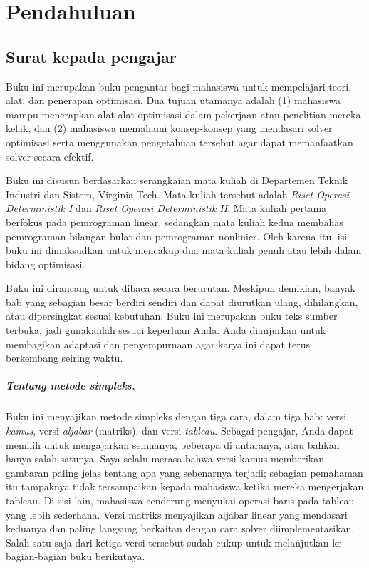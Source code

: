
\chapter*{Pendahuluan}
\section*{Surat kepada pengajar}

Buku ini merupakan buku pengantar bagi mahasiswa untuk mempelajari teori, alat, dan penerapan optimisasi.  Dua tujuan utamanya adalah (1) mahasiswa mampu menerapkan alat-alat optimisasi dalam pekerjaan atau penelitian mereka kelak, dan (2) mahasiswa memahami konsep-konsep yang mendasari solver optimisasi serta menggunakan pengetahuan tersebut agar dapat memanfaatkan solver secara efektif.

Buku ini disusun berdasarkan serangkaian mata kuliah di Departemen Teknik Industri dan Sistem, Virginia Tech.   Mata kuliah tersebut adalah \emph{Riset Operasi Deterministik I} dan \emph{Riset Operasi Deterministik II}.   Mata kuliah pertama berfokus pada pemrograman linear, sedangkan mata kuliah kedua membahas pemrograman bilangan bulat dan pemrograman nonlinier.  Oleh karena itu, isi buku ini dimaksudkan untuk mencakup dua mata kuliah penuh atau lebih dalam bidang optimisasi.

Buku ini dirancang untuk dibaca secara berurutan. Meskipun demikian, banyak bab yang sebagian besar berdiri sendiri dan dapat diurutkan ulang, dihilangkan, atau dipersingkat sesuai kebutuhan.  Buku ini merupakan buku teks sumber terbuka, jadi gunakanlah sesuai keperluan Anda.  Anda dianjurkan untuk membagikan adaptasi dan penyempurnaan agar karya ini dapat terus berkembang seiring waktu.

\paragraph{Tentang metode simpleks.}
Buku ini menyajikan metode simpleks dengan tiga cara, dalam tiga bab: versi \emph{kamus}, versi \emph{aljabar} (matriks), dan versi \emph{tableau}.  Sebagai pengajar, Anda dapat memilih untuk mengajarkan semuanya, beberapa di antaranya, atau bahkan hanya salah satunya.  Saya selalu merasa bahwa versi kamus memberikan gambaran paling jelas tentang apa yang sebenarnya terjadi; sebagian pemahaman itu tampaknya tidak tersampaikan kepada mahasiswa ketika mereka mengerjakan tableau.  Di sisi lain, mahasiswa cenderung menyukai operasi baris pada tableau yang lebih sederhana.  Versi matriks menyajikan aljabar linear yang mendasari keduanya dan paling langsung berkaitan dengan cara solver diimplementasikan.  Salah satu saja dari ketiga versi tersebut sudah cukup untuk melanjutkan ke bagian-bagian buku berikutnya.

